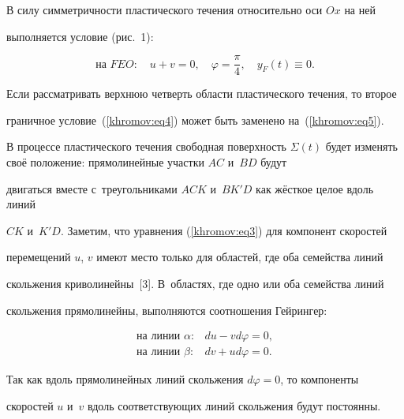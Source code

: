 В силу симметричности пластического течения относительно оси $Ox$ на ней 

выполняется условие (рис.~1):

\begin{equation}

\label{khromov:eq5}

\text{на $FEO$}: \quad

u + v = 0,\quad \varphi = \frac{\pi }{4},\quad y_F \left( t \right) \equiv 

0.

\end{equation}

Если рассматривать верхнюю четверть области пластического течения, то второе 

граничное условие~(\ref{khromov:eq4}) может быть заменено на~(\ref{khromov:eq5}). 



В процессе пластического течения свободная поверхность $\Sigma \left( t\right)$ будет изменять своё положение: прямолинейные участки $AC$ и~$BD$ будут 

двигаться вместе с~треугольниками $ACK$ и~$B{K}'D$ как жёсткое целое вдоль линий 

$CK$ и~${K}'D$. Заметим, что уравнения (\ref{khromov:eq3}) для компонент скоростей 

перемещений $u$, $v$ имеют место только для областей, где оба семейства линий 

скольжения криволинейны~[3]. В~областях, где одно или оба семейства линий 

скольжения прямолинейны, выполняются соотношения Гейрингер:

\begin{equation}

\label{khromov:eq6}

\begin{array}{ll}

  \text{на линии $\alpha$}: & du - vd\varphi = 0, \\ 

  \text{на линии $\beta$}:  & dv + ud\varphi = 0.

 \end{array}

\end{equation}

Так как вдоль прямолинейных линий скольжения $d\varphi = 0$, то компоненты 

скоростей $u$ и~$v$ вдоль соответствующих линий скольжения будут постоянны.



